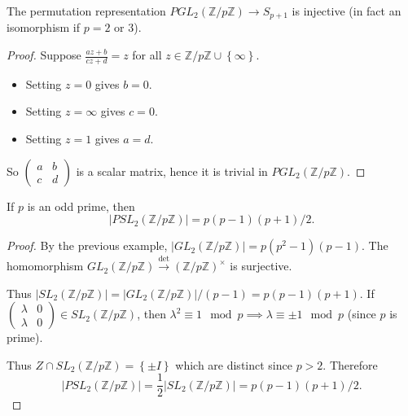 \documentclass[egregdoesnotlikesansseriftitles,a4paper]{scrartcl}
\begin{document}
\begin{lemma}\label{permrep}
      The permutation representation $PGL_{2}(\mathbb{Z}/p\mathbb{Z}) \rightarrow S_{p+1}$ is injective (in fact an isomorphism if $p=2$ or $3$).
      \begin{proof}
            Suppose $\frac{az+b}{cz+d}=z$ for all $z \in \mathbb{Z}/p\mathbb{Z} \cup \left\{ \infty\right\}$. 
            \begin{itemize}
                 \item Setting $z=0$ gives $b=0$.
                 \item Setting $z= \infty$ gives $c=0$.
                 \item Setting $z=1$ gives $a=d$.
            \end{itemize}
            So $\begin{pmatrix} a&b\\c&d \end{pmatrix}$ is a scalar matrix, hence it is trivial in $PGL_{2}(\mathbb{Z}/p\mathbb{Z}) $.
      \end{proof}
\end{lemma}
\begin{lemma}
      If $p$ is an odd prime, then \[
      |PSL_{2}(\mathbb{Z}/p\mathbb{Z})|=p (p-1)(p+1)/2
      .\] 
      \begin{proof}
            By the previous example, $|GL_2 (\mathbb{Z}/p\mathbb{Z})|=p (p^2-1)(p-1)$. The homomorphism $GL_2 (\mathbb{Z}/p\mathbb{Z}) \xrightarrow{\operatorname{det}} (\mathbb{Z}/p\mathbb{Z})^{\times}$ is surjective.
            
            Thus $|SL_2 (\mathbb{Z}/p\mathbb{Z})|=|GL_2 (\mathbb{Z}/p\mathbb{Z})|/(p-1)=p (p-1)(p+1)$. If $\begin{pmatrix} \lambda &0 \\ \lambda&0 \end{pmatrix} \in SL_2 (\mathbb{Z}/p\mathbb{Z})$, then $\lambda^2 \equiv 1 \mod p \implies \lambda \equiv \pm 1 \mod p$ (since $p$ is prime). 
      
            Thus $Z \cap SL_2 (\mathbb{Z}/p\mathbb{Z})=\left\{\pm I\right\}$ which are distinct since $p>2$. Therefore \[
                |PSL_2 (\mathbb{Z}/p\mathbb{Z})|=\frac{1}{2}|SL_2 (\mathbb{Z}/p\mathbb{Z})|=p (p-1)(p+1)/2
            .\] 
      \end{proof}
\end{lemma}
\end{document}
